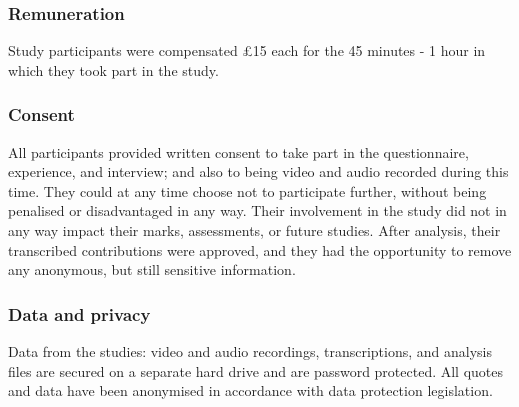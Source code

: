 \subsubsection{Remuneration}\label{sec: polaris-ethics-renumeration}
Study participants were compensated \pounds15 each for the 45 minutes - 1 hour in which they took part in the study.

\subsubsection{Consent}\label{sec: polaris-ethics-consent}
All participants provided written consent to take part in the questionnaire, experience, and interview; and also to being video and audio recorded during this time. They could at any time choose not to participate further, without being penalised or disadvantaged in any way. Their involvement in the study did not in any way impact their marks, assessments, or future studies. After analysis, their transcribed contributions were approved, and they had the opportunity to remove any anonymous, but still sensitive information.

\subsubsection{Data and privacy}\label{sec: polaris-ethics-data}
Data from the studies: video and audio recordings, transcriptions, and analysis files are secured on a separate hard drive and are password protected. All quotes and data have been anonymised in accordance with data protection legislation.




